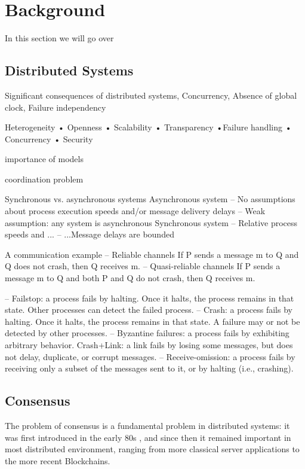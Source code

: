 \chapter{Background}\label{sec:Background}
In this section we will go over

\section{Distributed Systems}\label{sec:Distributed Systems}

Significant consequences of distributed systems, Concurrency, Absence of global clock, Failure independency

Heterogeneity • Openness
• Scalability
• Transparency •Failure handling • Concurrency
• Security

importance of models

coordination problem

Synchronous vs. asynchronous systems Asynchronous system
– No assumptions about process execution speeds and/or message delivery delays
– Weak assumption: any system is asynchronous
 Synchronous system
– Relative process speeds and ...
– ...Message delays are bounded

A communication example
– Reliable channels
If P sends a message m to Q and Q does not crash, then Q receives m.
– Quasi-reliable channels
If P sends a message m to Q and both P and Q do not crash, then Q receives m.

– Failstop: a process fails by halting. Once it halts, the process remains in that state. Other processes can detect the failed process.
– Crash: a process fails by halting. Once it halts, the process remains in that state. A failure may or not be detected by other processes.
– Byzantine failures: a process fails by exhibiting arbitrary behavior.
Crash+Link: a link fails by losing some messages, but does not delay, duplicate, or corrupt messages.
– Receive-omission: a process fails by receiving only a subset of the messages sent to it, or by halting (i.e., crashing).
\section{Consensus}\label{sec:Consensus}

The problem of consensus is a fundamental problem in distributed systems: it was first introduced in the early 80s \cite[]{Pease}, \cite[]{Lamport} and since then it remained important in most distributed environment, ranging from more classical server applications to the more recent Blockchains.

